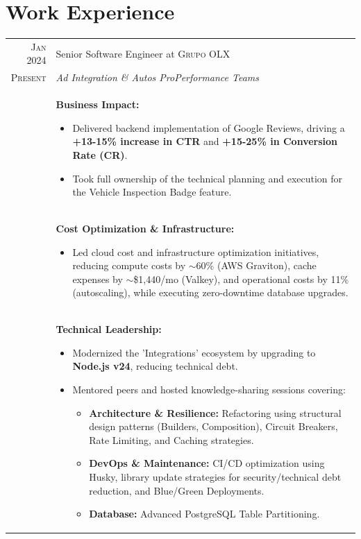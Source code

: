 \documentclass[a4paper,10pt]{article}
\begin{document}
\section{Work Experience}
\begin{supertabular}{r|p{15cm}}

\textsc{Jan 2024} & Senior Software Engineer at \textsc{Grupo OLX} \\
\textsc{Present}&\emph{Ad Integration \& Autos ProPerformance Teams}\\

& \footnotesize{
\textbf{Business Impact:}
\begin{itemize}
    \item Delivered backend implementation of Google Reviews, driving a \textbf{+13-15\% increase in CTR} and \textbf{+15-25\% in Conversion Rate (CR)}.
    \item Took full ownership of the technical planning and execution for the Vehicle Inspection Badge feature.
\end{itemize}
}\\

& \footnotesize{
\textbf{Cost Optimization \& Infrastructure:}
\begin{itemize}
    \item Led cloud cost and infrastructure optimization initiatives, reducing compute costs by $\sim$60\% (AWS Graviton), cache expenses by $\sim$\$1,440/mo (Valkey), and operational costs by 11\% (autoscaling), while executing zero-downtime database upgrades.
\end{itemize}
}\\

& \footnotesize{
\textbf{Technical Leadership:}
\begin{itemize}
    \item Modernized the 'Integrations' ecosystem by upgrading to \textbf{Node.js v24}, reducing technical debt.
    \item Mentored peers and hosted knowledge-sharing sessions covering:
    \begin{itemize}
        \item \textbf{Architecture \& Resilience:} Refactoring using structural design patterns (Builders, Composition), Circuit Breakers, Rate Limiting, and Caching strategies.
        \item \textbf{DevOps \& Maintenance:} CI/CD optimization using Husky, library update strategies for security/technical debt reduction, and Blue/Green Deployments.
        \item \textbf{Database:} Advanced PostgreSQL Table Partitioning.
    \end{itemize}
\end{itemize}

}
\end{supertabular}
\end{document}
